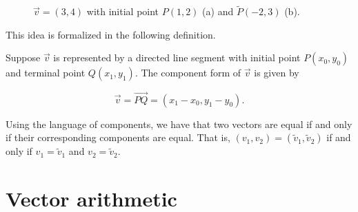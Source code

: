 \begin{figure}[H]
\centerline{
\hspace{0.1cm}
}
\caption{ $\vec{v} = \left(3,4\right)$ with initial point $P(1,2)$ (a) and $\widetilde{P}(-2,3)$ (b).}
\end{figure}

This idea is formalized in the following definition. 

\begin{definition} \label{componentformvector}  Suppose $\vec{v}$ is represented by a directed line segment with initial point $P\left(x_0, y_0\right)$ and terminal point $Q\left(x_1, y_1\right)$.  The component form of $\vec{v}$ is given by 

\[ \vec{v} = \overrightarrow{PQ} = \left( x_1 - x_0, y_1 - y_0 \right). \]


\end{definition}

Using the language of components, we have that two vectors are equal if and only if their corresponding components are equal.  That is, $\left(v_1, v_2\right) = \left(\widetilde{v}_1, \widetilde{v}_2\right)$ if and only if $v_1 = \widetilde{v}_1$ and $v_2 = \widetilde{v}_2$. 


\section{Vector arithmetic}
\label{sec_vector_arith}

